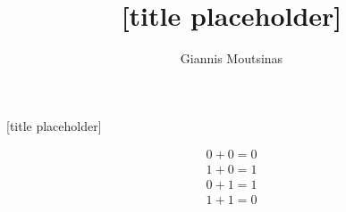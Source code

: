 \documentclass{beamer}
\title[Your Short Title]{[title placeholder]}
\author{Giannis Moutsinas}
\date{}
\begin{document}
\begin{frame}
  \titlepage
  \vfill

{\tiny
\doclicenseThis
}
\end{frame}


\begin{frame}{[title placeholder]}



\begin{align*}
0+0=0\\
1+0=1\\
0+1=1\\
1+1=0
\end{align*}

\end{frame}
\end{document}
